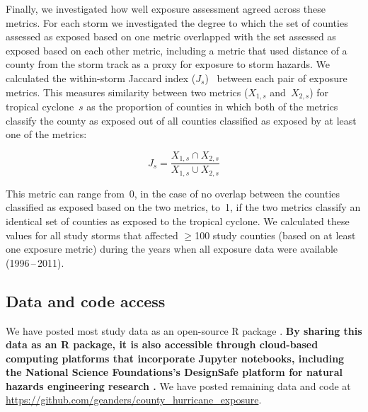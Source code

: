 Finally, we investigated how well exposure assessment agreed across 
these metrics. For each storm we investigated the degree to which the 
set of counties assessed as exposed based on one metric overlapped with the set
assessed as exposed based on each other metric, including a metric that used
distance of a county from the storm track as a proxy for exposure to storm hazards. 
We calculated the within-storm
Jaccard index ($J_s$)~\parencite{jaccard1901distribution, jaccard1908nouvelles} between
each pair of exposure metrics. This measures similarity
between two metrics ($X_{1,s}$ and~$X_{2,s}$) for tropical cyclone~$s$ as the
proportion of counties in which both of the metrics classify the county as
exposed out of all counties classified as exposed by at least one of the
metrics:

\begin{equation} 
J_s = \frac{X_{1,s} \cap X_{2,s}}{X_{1,s} \cup X_{2,s}}
\end{equation}

\noindent This metric can range from~0, in the case of no overlap between the
counties classified as exposed based on the two metrics, to~1, if
the two metrics classify an identical set of counties as exposed to the
tropical cyclone. We calculated these values for all study storms that affected
$\ge$100 study counties (based on at least one exposure metric) during the
years when all exposure data were available (1996\,--\,2011).

\subsection*{Data and code access}

We have posted most study data as an open-source R package
\parencite{hurricaneexposuredata}. \textbf{By sharing this data as an R package, it
is also accessible through cloud-based computing platforms that
incorporate Jupyter notebooks, including the National Science Foundations's
DesignSafe platform for natural hazards engineering research
\parencite{rathje2017designsafe}.} We have posted remaining data and code at
\url{https://github.com/geanders/county_hurricane_exposure}.
